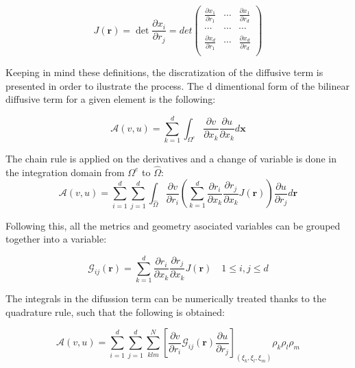 \documentclass[
  a4paper,
  10pt]{article}
\begin{document}
\begin{equation}
    J(\textbf{r})=\det\frac{\partial x_i}{\partial r_j}=det
    \begin{pmatrix}
    \frac{\partial x_1}{\partial r_1} & \cdots & \frac{\partial x_1}{\partial r_d}\\
    \cdots & \cdots & \cdots\\
    \frac{\partial x_d}{\partial r_1} & \cdots & \frac{\partial x_d}{\partial r_d}\\
\end{pmatrix}
\end{equation}

Keeping in mind these definitions, the discratization of the diffusive
term is presented in order to ilustrate the process. The d dimentional
form of the bilinear diffusive term for a given element is the
following:

\begin{equation}
    \mathcal{A}(v,u)=\sum_{k=1}^{d} \int_{\Omega^{e}} \frac{\partial v}{\partial x_k}\frac{\partial u}{\partial x_k} d\textbf{x} 
\end{equation}

The chain rule is applied on the derivatives and a change of variable is
done in the integration domain from \(\Omega^{e}\) to \(\hat{\Omega}\):
\begin{equation}
    \mathcal{A}(v,u)=\sum_{i=1}^{d} \sum_{j=1}^{d} \int_{\hat{\Omega}} \frac{\partial v}{\partial r_i} (\sum_{k=1}^{d}\frac{\partial r_i}{\partial x_k}\frac{\partial r_j}{\partial x_k} J(\textbf{r})) \frac{\partial u}{\partial r_j} d\textbf{r} 
\end{equation}

Following this, all the metrics and geometry asociated variables can be
grouped together into a variable:

\begin{equation}
\mathcal{G}_{ij}(\textbf{r})=\sum_{k=1}^{d}\frac{\partial r_i}{\partial x_k}\frac{\partial r_j}{\partial x_k} J(\textbf{r}) \quad 1 \leq i,j \leq d
\end{equation}

The integrals in the difussion term can be numerically treated thanks to
the quadrature rule, such that the following is obtained:

\begin{equation}
    \mathcal{A}(v,u)=\sum_{i=1}^{d} \sum_{j=1}^{d} \sum_{klm}^{N} \left[ \frac{\partial v}{\partial r_i}  \mathcal{G}_{ij}(\textbf{r}) \frac{\partial u}{\partial r_j} \right]_{(\xi_k,\xi_l,\xi_m)} \rho_k \rho_l \rho_m 
\end{equation}
\end{document}
